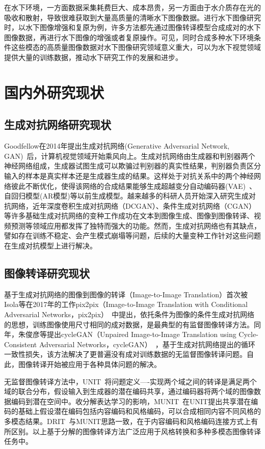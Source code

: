 在水下环境，一方面数据采集耗费巨大、成本昂贵，另一方面由于水介质存在光的吸收和散射，导致很难获取到大量高质量的清晰水下图像数据。进行水下图像研究时，以水下图像增强和复原为例，许多方法都先通过图像转译模型合成成对的水下图像数据，再进行水下图像的增强或者复原操作。可见，同时合成多种水下环境条件这些模态的高质量图像数据对水下图像研究领域意义重大，可以为水下视觉领域提供大量的训练数据，推动水下研究工作的发展和进步。


\section{国内外研究现状}
\subsection{生成对抗网络研究现状}
Goodfellow在2014年提出生成对抗网络(Generative Adversarial Network, GAN)~\cite{goodfellow2014generative}后，计算机视觉领域开始乘风向上。生成对抗网络由生成器和判别器两个神经网络组成，生成器试图生成可以欺骗过判别器的真实性结果，判别器负责区分输入的样本是真实样本还是生成器生成的结果。这样处于对抗关系中的两个神经网络彼此不断优化，使得该网络的合成结果能够生成超越变分自动编码器(VAE)~\cite{kingma2013auto}、自回归模型(AR模型)等以前生成模型。越来越多的科研人员开始深入研究生成对抗网络，近年深度卷积生成对抗网络（DCGAN）、条件生成对抗网络（CGAN）等许多基础生成对抗网络的变种工作成功在文本到图像生成、图像到图像转译、视频预测等领域应用都发挥了独特而强大的功能。然而，生成对抗网络也有其缺点，譬如存在训练不稳定、会产生模式崩塌等问题，后续的大量变种工作针对这些问题在生成对抗模型上进行解决。


\subsection{图像转译研究现状}
基于生成对抗网络的图像到图像的转译（Image-to-Image Translation）首次被Isola等在2017年的工作pix2pix（Image-to-Image Translation with Conditional Adversarial Networks，pix2pix）~\cite{isola2017image}中提出，依托条件为图像的条件生成对抗网络的思想，训练图像使用尺寸相同的成对数据，是最典型的有监督图像转译方法。同年，朱俊彦等提出cycleGAN（Unpaired Image-to-Image Translation using Cycle-Consistent Adversarial Networks，cycleGAN）~\cite{zhu2017unpaired}，基于生成对抗网络提出的循环一致性损失，该方法解决了更普遍没有成对训练数据的无监督图像转译问题。自此，图像转译开始被应用于各种具体问题的解决。

无监督图像转译方法中，UNIT~\cite{liu2017unsupervised}将问题定义----实现两个域之间的转译是满足两个域的联合分布，假设输入到生成器的潜在编码共享，通过编码器将两个域的图像数据编码到潜在空间中。收分解表达学习的影响，MUNIT~\cite{huang2018multimodal}在UNIT提出共享潜在编码的基础上假设潜在编码包括内容编码和风格编码，可以合成相同内容不同风格的多模态结果。DRIT~\cite{lee2018diverse}与MUNIT思路一致，在于内容编码和风格编码连接方式上有所区别。以上基于分解的图像转译方法广泛应用于风格转换和多种多模态图像转译任务中。


